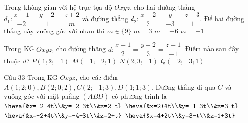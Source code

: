 \begin{ex}%
Trong không gian với hệ trục tọa độ $O x y z$, cho hai đường thẳng \\ $d_1\colon \dfrac{x-1}{-2}=\dfrac{y-2}{1}=\dfrac{z+2}{m}$ và đường thẳng $d_2\colon \dfrac{x-2}{3}=\dfrac{y}{-3}=\dfrac{z-3}{1}$. Để hai đường thẳng này vuông góc với nhau thì
\choice
{\True $m \in\{9\}$}
{$m=3$}
{$m=-6$}
{$m=-1$}
\end{ex}

\begin{ex}%
Trong KG $Oxyz$, cho đường thẳng $d\colon \dfrac{x-1}{2}=\dfrac{y-2}{3}=\dfrac{z+1}{-1}$. Điểm nào sau đây thuộc $d$?
\choice
{\True $P\left( 1;2;-1 \right)$}
{$M\left( -1;-2;1 \right)$}
{$N\left( 2;3;-1 \right)$}
{$Q\left( -2;-3;1 \right)$}
\end{ex}

\begin{ex}Câu 33%
Trong KG $Oxyz$, cho các điểm $A(1;2;0), B(2;0;2), C(2;-1;3), D(1;1;3)$. Đường thẳng đi qua $C$ và vuông góc với mặt phẳng $(ABD)$ có phương trình là
\choice
{$\heva{&x=-2-4t\\&y=-2-3t\\&z=2-t}$}
{$\heva{&x=2+4t\\&y=-1+3t\\&z=3-t}$}
{\True $\heva{&x=-2+4t\\&y=-4+3t\\&z=2+t}$}
{$\heva{&x=4+2t\\&y=3-t\\&z=1+3t}$}
\end{ex}

